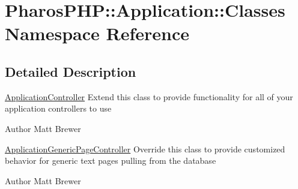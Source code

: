 \hypertarget{namespace_pharos_p_h_p_1_1_application_1_1_classes}{
\section{PharosPHP::Application::Classes Namespace Reference}
\label{namespace_pharos_p_h_p_1_1_application_1_1_classes}
}


\subsection{Detailed Description}
\hyperlink{class_application_controller}{ApplicationController} Extend this class to provide functionality for all of your application controllers to use

\begin{DoxyAuthor}{Author}
Matt Brewer
\end{DoxyAuthor}
\hyperlink{class_application_generic_page_controller}{ApplicationGenericPageController} Override this class to provide customized behavior for generic text pages pulling from the database

\begin{DoxyAuthor}{Author}
Matt Brewer 
\end{DoxyAuthor}
